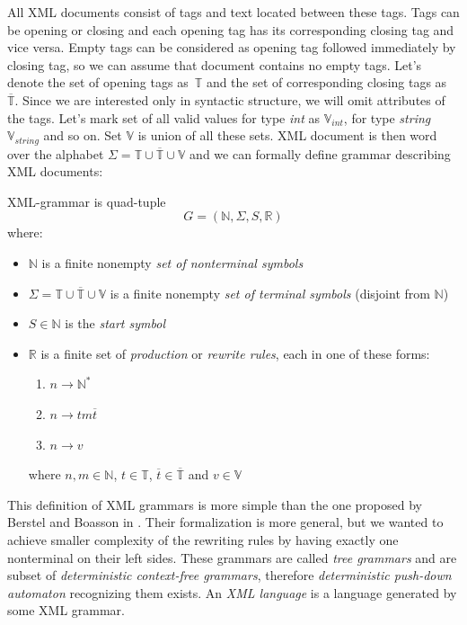 \documentclass[12pt,notitlepage]{report}
\begin{document}
All XML documents consist of tags and text located between these tags. Tags can be opening or closing and each opening tag has its corresponding closing tag and vice versa. Empty tags can be considered as opening tag followed immediately by closing tag, so we can assume that document contains no empty tags.
Let's denote the set of opening tags as~$\mathbb{T}$ and the set of corresponding closing tags as~$\overline{\mathbb{T}}$. Since we are interested only in syntactic structure, we will omit attributes of the tags. Let's mark set of all valid values for type \textit{int} as $\mathbb{V}_{int}$, for type \textit{string} $\mathbb{V}_{string}$ and so on. Set $\mathbb{V}$ is union of all these sets. XML document is then word over the alphabet $\Sigma = \mathbb{T} \cup \overline{\mathbb{T}} \cup \mathbb{V}$ and we can formally define grammar describing XML documents:

\begin{definition}
XML-grammar is quad-tuple \[G = (\mathbb{N}, \Sigma, S, \mathbb{R})\] where:

\begin{itemize}
 \item $\mathbb{N}$ is a finite nonempty \textit{set of nonterminal symbols}
 \item $\Sigma = \mathbb{T} \cup \overline{\mathbb{T}} \cup \mathbb{V}$ is a finite nonempty \textit{set of terminal symbols} (disjoint from $\mathbb{N}$)
 \item $S \in \mathbb{N}$ is the \textit{start symbol}
 \item $\mathbb{R}$ is a finite set of \textit{production} or \textit{rewrite rules}, each in one of these forms:
   \begin{enumerate}
    \item $n \rightarrow \mathbb{N}^{*}$
    \item $n \rightarrow t m \overline{t}$
    \item $n \rightarrow v$
   \end{enumerate}
   where $n, m \in \mathbb{N}$, $t \in \mathbb{T}$, $\overline{t} \in \overline{\mathbb{T}}$ and $v \in \mathbb{V}$
\end{itemize}
\end{definition}

This definition of XML grammars is more simple than the one proposed by Berstel and Boasson in \cite{berstel-boasson}. Their formalization is more general, but we wanted to achieve smaller complexity of the rewriting rules by having exactly one nonterminal on their left sides. These grammars are called \textit{tree grammars} and are subset of \textit{deterministic context-free grammars}, therefore \textit{deterministic push-down automaton} recognizing them exists. An \textit{XML language} is a language generated by some XML grammar.
\end{document}
